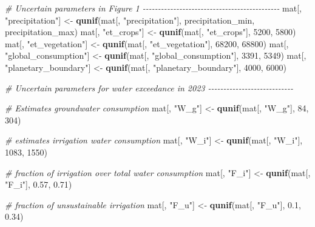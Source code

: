 \documentclass[
  11pt,
]{article}
\newenvironment{Shaded}{\begin{snugshade}}{\end{snugshade}}
\newcommand{\CommentTok}[1]{\textcolor[rgb]{0.56,0.35,0.01}{\textit{#1}}}
\newcommand{\DecValTok}[1]{\textcolor[rgb]{0.00,0.00,0.81}{#1}}
\newcommand{\FloatTok}[1]{\textcolor[rgb]{0.00,0.00,0.81}{#1}}
\newcommand{\FunctionTok}[1]{\textcolor[rgb]{0.13,0.29,0.53}{\textbf{#1}}}
\newcommand{\NormalTok}[1]{#1}
\newcommand{\OtherTok}[1]{\textcolor[rgb]{0.56,0.35,0.01}{#1}}
\newcommand{\StringTok}[1]{\textcolor[rgb]{0.31,0.60,0.02}{#1}}
\begin{document}
\begin{Shaded}
\begin{Highlighting}[]
\CommentTok{\# Uncertain parameters in Figure 1 {-}{-}{-}{-}{-}{-}{-}{-}{-}{-}{-}{-}{-}{-}{-}{-}{-}{-}{-}{-}{-}{-}{-}{-}{-}{-}{-}{-}{-}{-}{-}{-}{-}{-}{-}{-}{-}{-}{-}{-}{-}{-}{-}{-}{-}}
\NormalTok{mat[, }\StringTok{"precipitation"}\NormalTok{] }\OtherTok{\textless{}{-}} \FunctionTok{qunif}\NormalTok{(mat[, }\StringTok{"precipitation"}\NormalTok{], precipitation\_min, precipitation\_max)}
\NormalTok{mat[, }\StringTok{"et\_crops"}\NormalTok{] }\OtherTok{\textless{}{-}} \FunctionTok{qunif}\NormalTok{(mat[, }\StringTok{"et\_crops"}\NormalTok{], }\DecValTok{5200}\NormalTok{, }\DecValTok{5800}\NormalTok{)}
\NormalTok{mat[, }\StringTok{"et\_vegetation"}\NormalTok{] }\OtherTok{\textless{}{-}} \FunctionTok{qunif}\NormalTok{(mat[, }\StringTok{"et\_vegetation"}\NormalTok{], }\DecValTok{68200}\NormalTok{, }\DecValTok{68800}\NormalTok{)}
\NormalTok{mat[, }\StringTok{"global\_consumption"}\NormalTok{] }\OtherTok{\textless{}{-}} \FunctionTok{qunif}\NormalTok{(mat[, }\StringTok{"global\_consumption"}\NormalTok{], }\DecValTok{3391}\NormalTok{, }\DecValTok{5349}\NormalTok{)}
\NormalTok{mat[, }\StringTok{"planetary\_boundary"}\NormalTok{] }\OtherTok{\textless{}{-}} \FunctionTok{qunif}\NormalTok{(mat[, }\StringTok{"planetary\_boundary"}\NormalTok{], }\DecValTok{4000}\NormalTok{, }\DecValTok{6000}\NormalTok{)}

\CommentTok{\# Uncertain parameters for water exceedance in 2023 {-}{-}{-}{-}{-}{-}{-}{-}{-}{-}{-}{-}{-}{-}{-}{-}{-}{-}{-}{-}{-}{-}{-}{-}{-}{-}{-}{-}}

\CommentTok{\# Estimates groundwater consumption}
\NormalTok{mat[, }\StringTok{"W\_g"}\NormalTok{] }\OtherTok{\textless{}{-}} \FunctionTok{qunif}\NormalTok{(mat[, }\StringTok{"W\_g"}\NormalTok{], }\DecValTok{84}\NormalTok{, }\DecValTok{304}\NormalTok{) }

\CommentTok{\# estimates irrigation water consumption}
\NormalTok{mat[, }\StringTok{"W\_i"}\NormalTok{] }\OtherTok{\textless{}{-}} \FunctionTok{qunif}\NormalTok{(mat[, }\StringTok{"W\_i"}\NormalTok{], }\DecValTok{1083}\NormalTok{, }\DecValTok{1550}\NormalTok{) }

\CommentTok{\# fraction of irrigation over total water consumption}
\NormalTok{mat[, }\StringTok{"F\_i"}\NormalTok{] }\OtherTok{\textless{}{-}} \FunctionTok{qunif}\NormalTok{(mat[, }\StringTok{"F\_i"}\NormalTok{], }\FloatTok{0.57}\NormalTok{, }\FloatTok{0.71}\NormalTok{) }

\CommentTok{\# fraction of unsustainable irrigation}
\NormalTok{mat[, }\StringTok{"F\_u"}\NormalTok{] }\OtherTok{\textless{}{-}} \FunctionTok{qunif}\NormalTok{(mat[, }\StringTok{"F\_u"}\NormalTok{], }\FloatTok{0.1}\NormalTok{, }\FloatTok{0.34}\NormalTok{) }


\end{Highlighting}
\end{Shaded}
\end{document}
